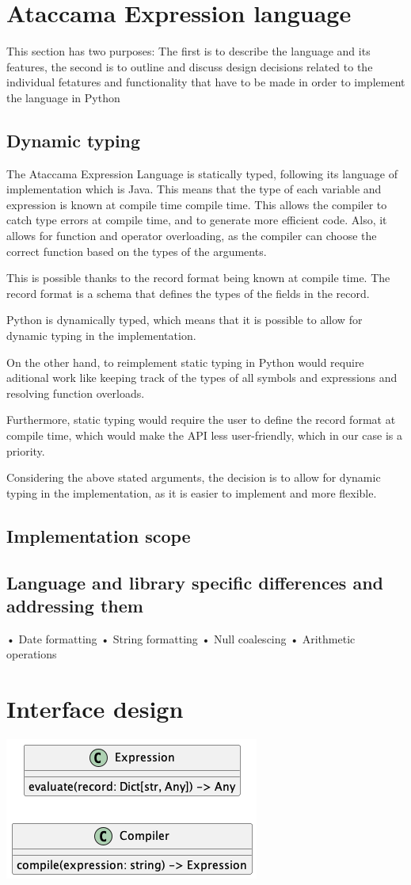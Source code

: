 \section{Ataccama Expression language}

This section has two purposes: The first is to describe the language and its features, the second is to outline and discuss design decisions related to the individual fetatures and functionality that have to be made in order to implement the language in Python 

\subsection{Dynamic typing}

The Ataccama Expression Language is statically typed, following its language of implementation which is Java. This means that the type of each variable and expression is known at compile time compile time. This allows the compiler to catch type errors at compile time, and to generate more efficient code. Also, it allows for function and operator overloading, as the compiler can choose the correct function based on the types of the arguments.

This is possible thanks to the record format being known at compile time. The record format is a schema that defines the types of the fields in the record. 

Python is dynamically typed, which means that it is possible to allow for dynamic typing in the implementation. 

On the other hand, to reimplement static typing in Python would require aditional work like keeping track of the types of all symbols and expressions and resolving function overloads. 

Furthermore, static typing would require the user to define the record format at compile time, which would make the API less user-friendly, which in our case is a priority.

Considering the above stated arguments, the decision is to allow for dynamic typing in the implementation, as it is easier to implement and more flexible.


\subsection{Implementation scope}
\subsection{Language and library specific differences and addressing them}
• Date formatting
• String formatting
• Null coalescing
• Arithmetic operations

\section{Interface design}

\includegraphics{diagrams/api_design-class.png}